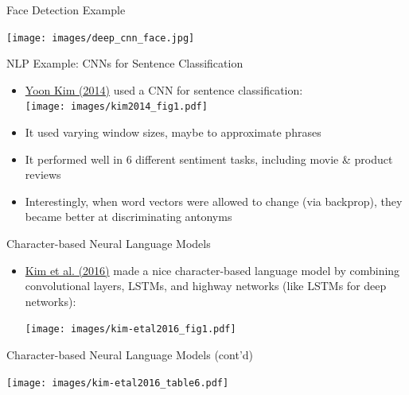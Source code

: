 \documentclass[xcolor=pdftex,x11names,table,hyperref]{beamer}
\newcommand{\conv}{convolutional}
\begin{document}


\begin{frame}{Face Detection Example}
	\begin{center}
	\texttt{[image: images/deep\_cnn\_face.jpg]}
	\end{center}
\end{frame}

\begin{frame}{NLP Example: CNNs for Sentence Classification}
\begin{itemize}
	\item \href{https://www.aclweb.org/anthology/D14-1181.pdf}{Yoon Kim (2014)} used a CNN for sentence classification: \\[1.0em]
	\hspace*{-2.0em}%
	\texttt{[image: images/kim2014\_fig1.pdf]}
	\pause
	\item It used varying window sizes, maybe to approximate phrases
	\pause
	\item It performed well in 6 different sentiment tasks, including movie \& product reviews
	\pause
	\item Interestingly, when word vectors were allowed to change (via backprop), they became better at discriminating antonyms
\end{itemize}
\end{frame}

\begin{frame}{Character-based Neural Language Models}
\begin{itemize}
	\item \href{http://arxiv.org/abs/1508.06615}{Kim et al. (2016)} made a nice character-based language model by combining \conv{} layers, LSTMs, and highway networks (like LSTMs for deep networks): \\
	\begin{center}
	\texttt{[image: images/kim-etal2016\_fig1.pdf]}
	\end{center}
\end{itemize}
\end{frame}

\begin{frame}{Character-based Neural Language Models (cont'd)}
	\begin{center}
	\texttt{[image: images/kim-etal2016\_table6.pdf]}
	\end{center}
\end{frame}
\end{document}
